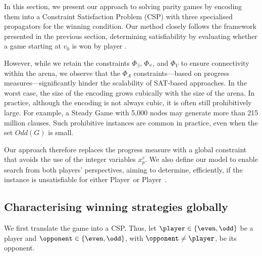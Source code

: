 \documentclass[runningheads]{llncs}
\begin{document}
In this section, we present our approach to solving parity games by encoding them into a Constraint Satisfaction Problem (CSP) with three specialised propagators for the winning condition. Our method closely follows the framework presented in the previous section, determining satisfiability by evaluating whether a game starting at $v_0$ is won by player \even.

However, while we retain the constraints $\Phi_\exists$, $\Phi_\forall$, and $\Phi_V$ to ensure connectivity within the arena, we observe that the $\Phi_A$ constraints—based on progress measures—significantly hinder the scalability of SAT-based approaches. 
In the worst case, the size of the encoding grows cubically with the size of the arena. In practice, although the encoding is not always cubic, it is often still prohibitively large. For example, a Steady Game with 5,000 nodes may generate more than 215 million clauses. Such prohibitive instances are common in practice, even when the set $\textit{Odd}(G)$ is small.

Our approach therefore replaces the progress measure with a global constraint that avoids the use of the integer variables $x_p^v$. We also define our model to enable search from both players’ perspectives, aiming to determine, efficiently, if the instance is unsatisfiable for either Player~\even or Player~\odd.

\subsection{Characterising winning strategies globally}

We first translate the game into a CSP.
%
Thus, let \( \player \in \{ \even, \odd \} \) be a player and \( \opponent \in \{ \even, \odd \} \), with \( \opponent \neq \player \), be its opponent.
\end{document}
